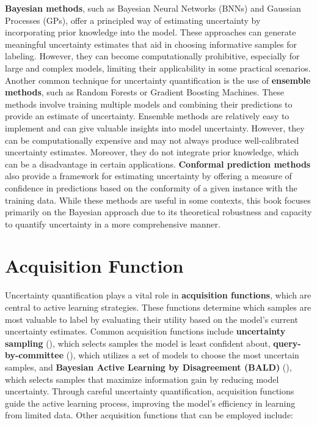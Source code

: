 \documentclass[
  letterpaper,
  numbers=noenddot,
  DIV=11]{scrreprt}
\theoremstyle{definition}
\theoremstyle{plain}
\theoremstyle{plain}
\theoremstyle{remark}
\begin{document}
\textbf{Bayesian methods}, such as Bayesian Neural Networks (BNNs) and
Gaussian Processes (GPs), offer a principled way of estimating
uncertainty by incorporating prior knowledge into the model. These
approaches can generate meaningful uncertainty estimates that aid in
choosing informative samples for labeling. However, they can become
computationally prohibitive, especially for large and complex models,
limiting their applicability in some practical scenarios. Another common
technique for uncertainty quantification is the use of \textbf{ensemble
methods}, such as Random Forests or Gradient Boosting Machines. These
methods involve training multiple models and combining their predictions
to provide an estimate of uncertainty. Ensemble methods are relatively
easy to implement and can give valuable insights into model uncertainty.
However, they can be computationally expensive and may not always
produce well-calibrated uncertainty estimates. Moreover, they do not
integrate prior knowledge, which can be a disadvantage in certain
applications. \textbf{Conformal prediction methods} also provide a
framework for estimating uncertainty by offering a measure of confidence
in predictions based on the conformity of a given instance with the
training data. While these methods are useful in some contexts, this
book focuses primarily on the Bayesian approach due to its theoretical
robustness and capacity to quantify uncertainty in a more comprehensive
manner.

\section{Acquisition Function}\label{acquisition-function}

Uncertainty quantification plays a vital role in \textbf{acquisition
functions}, which are central to active learning strategies. These
functions determine which samples are most valuable to label by
evaluating their utility based on the model's current uncertainty
estimates. Common acquisition functions include \textbf{uncertainty
sampling} (), which
selects samples the model is least confident about,
\textbf{query-by-committee} (), which utilizes a set of models to choose the most uncertain
samples, and \textbf{Bayesian Active Learning by Disagreement (BALD)}
(), which selects samples
that maximize information gain by reducing model uncertainty. Through
careful uncertainty quantification, acquisition functions guide the
active learning process, improving the model's efficiency in learning
from limited data. Other acquisition functions that can be employed
include:
\end{document}
